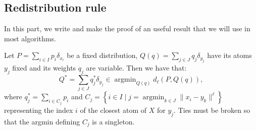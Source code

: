 \documentclass{amsart}
\newcommand{\argmin}{\mathop{\arg\min}}
\begin{document}
\subsection{Redistribution rule}\label{redistribution rule}
In this part, we write and make the proof of an useful result that we will use in most algorithms.
\begin{theorem}\label{closed formula}
    Let $P=\sum_{i\in I}p_i\delta_{x_i}$ be a fixed distribution, $Q\left(q\right)=\sum_{j\in J}q_j\delta_{y_j}$ have its atoms $y_j$ fixed and its weights $q_j$ are variable. Then we have that: 
    $$Q^*=\sum_{j\in J}q_j^*\delta_{y_j}\in \argmin_{Q\left(q\right)} d_\ell\left(P,Q\left(q\right)\right),$$
    where $q_j^*=\sum_{i\in C_j}p_i$ and $C_j=\left\{i\in I \mid j=\argmin_{k\in J} \lVert x_i-y_k\rVert^\ell\right\}$ representing the index $i$ of the closest atom of $X$ for $y_j$. Ties must be broken so that the argmin defining $C_j$ is a singleton.
\end{theorem}
\end{document}
